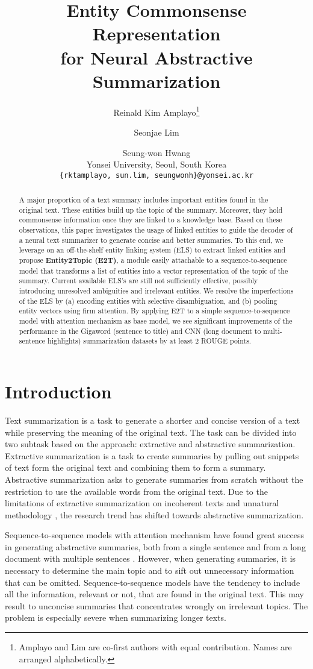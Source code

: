 \documentclass[11pt,a4paper]{article}
\title{Entity Commonsense Representation\\ for Neural Abstractive Summarization}
\author{Reinald Kim Amplayo\thanks{{ } Amplayo and Lim are co-first authors with equal contribution. Names are arranged alphabetically.} \and
  Seonjae Lim\footnotemark[1] \and
Seung-won Hwang \\
  Yonsei University, Seoul, South Korea \\
  {\tt \{rktamplayo, sun.lim, seungwonh\}@yonsei.ac.kr} \\
}
\date{}
\begin{document}
\maketitle
\begin{abstract}
  A major proportion of a text summary includes important entities found in the original text. These entities build up the topic of the summary. Moreover, they hold commonsense information once they are linked to a knowledge base. Based on these observations, this paper investigates the usage of linked entities to guide the decoder of a neural text summarizer to generate concise and better summaries. To this end, we leverage on an off-the-shelf entity linking system (ELS) to extract linked entities and propose \textbf{Entity2Topic (E2T)}, a module easily attachable to a sequence-to-sequence model that transforms a list of entities into a vector representation of the topic of the summary. Current available ELS's are still not sufficiently effective, possibly introducing unresolved ambiguities and irrelevant entities. We resolve the imperfections of the ELS by (a) encoding entities with selective disambiguation, and (b) pooling entity vectors using firm attention. By applying E2T to a simple sequence-to-sequence model with attention mechanism as base model, we see significant improvements of the performance in the Gigaword (sentence to title) and CNN (long document to multi-sentence highlights) summarization datasets by at least 2 ROUGE points.
\end{abstract}

\section{Introduction}
\label{sec:intro}

Text summarization is a task to generate a shorter and concise version of a text while preserving the meaning of the original text. The task can be divided into two subtask based on the approach: extractive and abstractive summarization. Extractive summarization is a task to create summaries by pulling out snippets of text form the original text and combining them to form a summary. Abstractive summarization
asks to generate summaries from scratch without the restriction to use the available words from the original text. Due to the limitations of extractive summarization on incoherent texts and unnatural methodology \cite{yao2017recent}, the research trend has shifted towards abstractive summarization.

Sequence-to-sequence models \cite{sutskever2014sequence} with attention mechanism \cite{bahdanau2014neural} have found great success in generating abstractive summaries, both from a single sentence \cite{chopra2016abstractive} and from a long document with multiple sentences \cite{chen2016distraction}. However, when generating summaries, it is necessary to determine the main topic and to sift out unnecessary information that can be omitted. Sequence-to-sequence models have the tendency to include all the information, relevant or not, that are found in the original text. This may result to unconcise summaries that concentrates wrongly on irrelevant topics. The problem is especially severe when summarizing longer texts.
\end{document}

